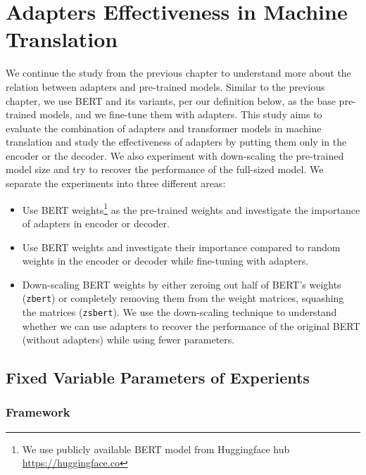 
\chapter{Adapters Effectiveness in Machine Translation}
\label{chap:adaptefct}
We continue the study from the previous chapter to understand more about the relation between adapters and pre-trained models. Similar to the previous chapter, we use BERT and its variants, per our definition below, as the base pre-trained models, and we fine-tune them with adapters. This study aims to evaluate the combination of adapters and transformer models in machine translation and study the effectiveness of adapters by putting them only in the encoder or the decoder. We also experiment with down-scaling the pre-trained model size and try to recover the performance of the full-sized model. We separate the experiments into three different areas:
\begin{itemize}
    \item Use BERT weights\footnote{We use publicly available BERT model from Huggingface hub \url{https://huggingface.co}} as the pre-trained weights and investigate the importance of adapters in encoder or decoder.
    \item Use BERT weights and investigate their importance compared to random weights in the encoder or decoder while fine-tuning with adapters.
    \item Down-scaling BERT weights by either zeroing out half of BERT's weights (\texttt{zbert}) or completely removing them from the weight matrices, squashing the matrices (\texttt{zsbert}). We use the down-scaling technique to understand whether we can use adapters to recover the performance of the original BERT (without adapters) while using fewer parameters.
\end{itemize}

\section{Fixed Variable Parameters of Experients}
\subsection{Framework}


